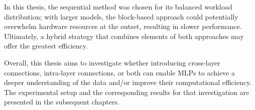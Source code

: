 In this thesis, the sequential method was chosen for its balanced workload distribution; with larger models, the block-based approach could potentially overwhelm hardware resources at the outset, resulting in slower performance. Ultimately, a hybrid strategy that combines elements of both approaches may offer the greatest efficiency.

Overall, this thesis aims to investigate whether introducing cross-layer connections, intra-layer connections, or both can enable MLPs to achieve a deeper understanding of the data and/or improve their computational efficiency. The experimental setup and the corresponding results for that investigation are presented in the subsequent chapters.